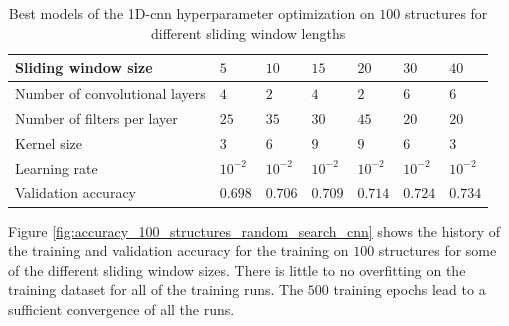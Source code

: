 \documentclass[conference]{IEEEtran}
\begin{document}
\begin{table}[htp]
	\centering
	\caption{Best models of the 1D-\gls{cnn} hyperparameter optimization on $ 100 $ structures for different sliding window lengths}
	\label{tab:hyperparameters_100_structures_cnn}
	\setlength{\tabcolsep}{3pt} %
	\begin{tabular}{p{2.5cm}|llllll}
		Sliding window size & $ 5 $ & $ 10 $ & $ 15 $ & $ 20 $ & $ 30 $ & $ 40 $ \\
		\hline
		Number of convolutional layers & $ 4 $ & $ 2 $ & $ 4 $ & $ 2 $ & $ 6 $ & $ 6 $ \\
		Number of filters per layer & $ 25 $ & $ 35 $ & $ 30 $ & $ 45 $ & $ 20 $ & $ 20 $ \\
		Kernel size & $ 3 $ & $ 6 $ & $ 9 $ & $ 9 $ & $ 6 $ & $ 3 $ \\
		Learning rate & $ 10^{-2} $ & $ 10^{-2} $ & $ 10^{-2} $ & $ 10^{-2} $ & $ 10^{-2} $ & $ 10^{-2} $ \\
		\hline
		Validation accuracy & $ 0.698 $ & $ 0.706 $ & $ 0.709 $ & $ 0.714 $ & $ 0.724 $ & $ 0.734 $
	\end{tabular}
\end{table}

Figure \ref{fig:accuracy_100_structures_random_search_cnn} shows the history of the training and validation accuracy for the training on $ 100 $ structures for some of the different sliding window sizes. There is little to no overfitting on the training dataset for all of the training runs. The $ 500 $ training epochs lead to a sufficient convergence of all the runs.
\end{document}
